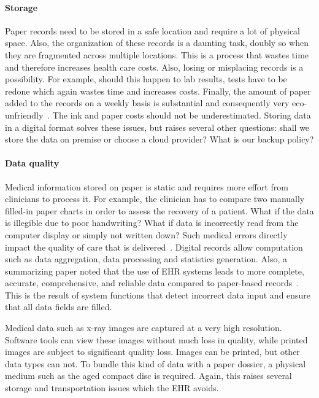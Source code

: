     \paragraph{Storage} Paper records need to be stored in a safe location and require a lot of physical space. Also, the organization of these records is a daunting task, doubly so when they are fragmented across multiple locations. This is a process that wastes time and therefore increases health care costs. Also, losing or misplacing records is a possibility. For example, should this happen to lab results, tests have to be redone which again wastes time and increases costs. Finally, the amount of paper added to the records on a weekly basis is substantial and consequently very eco-unfriendly~\cite{Saleem2009}. The ink and paper costs should not be underestimated. Storing data in a digital format solves these issues, but raises several other questions: shall we store the data on premise or choose a cloud provider? What is our backup policy? 

    \paragraph{Data quality} Medical information stored on paper is static and requires more effort from clinicians to process it. For example, the clinician has to compare two manually filled-in paper charts in order to assess the recovery of a patient. What if the data is illegible due to poor handwriting? What if data is incorrectly read from the computer display or simply not written down? Such medical errors directly impact the quality of care that is delivered~\cite{Elnahal2011, Hillestad2005}. Digital records allow computation such as data aggregation, data processing and statistics generation. Also, a summarizing paper noted that the use of EHR systems leads to more complete, accurate, comprehensive, and reliable data compared to paper-based records~\cite{Hayrinen2008}. This is the result of system functions that detect incorrect data input and ensure that all data fields are filled.

    Medical data such as x-ray images are captured at a very high resolution. Software tools can view these images without much loss in quality, while printed images are subject to significant quality loss. Images can be printed, but other data types can not. To bundle this kind of data with a paper dossier, a physical medium such as the aged compact disc is required. Again, this raises several storage and transportation issues which the EHR avoids.

